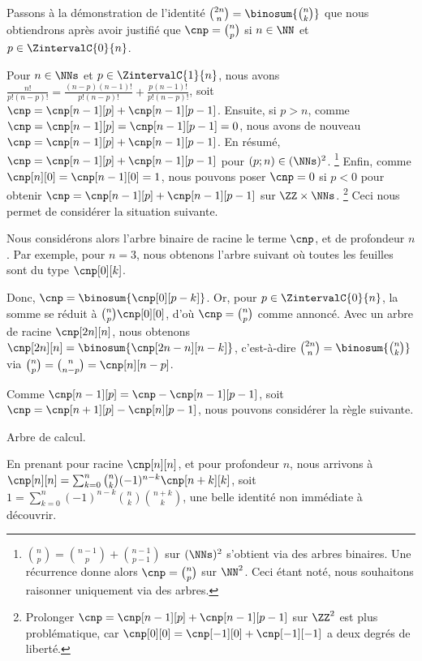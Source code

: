 Passons à la démonstration de
l'identité $\binom{2n}{n} = \binosum{\binom{n}{k}}$
que nous obtiendrons après avoir justifié que
$\cnp = \binom{n}{p}$ si $n \in \NN$ et $p \in \ZintervalC{0}{n}$.


Pour $n \in \NNs$ et $p \in \ZintervalC{1}{n}$,
nous avons
$\frac{n!}{p!(n-p)!}
=\frac{(n-p)(n-1)!}{p!(n-p)!} + \frac{p(n-1)!}{p!(n-p)!}$,
soit
$\cnp = \cnp[n-1][p] + \cnp[n-1][p-1]$.
Ensuite,
si $p > n$, comme
$\cnp = \cnp[n-1][p] = \cnp[n-1][p-1] = 0$,
nous avons de nouveau
$\cnp = \cnp[n-1][p] + \cnp[n-1][p-1]$.
En résumé,
$\cnp = \cnp[n-1][p] + \cnp[n-1][p-1]$ pour $(p;n) \in (\NNs)^2$.%
\footnote{
    $\binom{n}{p} = \binom{n-1}{p} + \binom{n-1}{p-1}$ sur $ (\NNs)^2$
    s'obtient via des arbres binaires.
    Une récurrence donne alors
    $\cnp = \binom{n}{p}$ sur $\NN^2$.
    Ceci étant noté, nous souhaitons raisonner uniquement via des arbres.
}
Enfin,
comme
$\cnp[n][0] = \cnp[n-1][0] = 1$,
nous pouvons poser
$\cnp = 0$ si $p < 0$
pour obtenir
$\cnp = \cnp[n-1][p] + \cnp[n-1][p-1]$ sur $\ZZ \times \NNs$.%
\footnote{
    Prolonger $\cnp = \cnp[n-1][p] + \cnp[n-1][p-1]$ sur $\ZZ^2$ est plus problématique, car $\cnp[0][0] = \cnp[-1][0] + \cnp[-1][-1]$ a deux degrés de liberté.
}
%
Ceci nous permet de considérer la situation suivante.

\explaintree{\cnp}{\cnp[n-1][p-1]}{\cnp[n-1][p]}%
            {\factobinomintertree}{}


Nous considérons alors l'arbre binaire de racine le terme $\cnp$, et de profondeur $n$.
Par exemple, pour $n=3$, nous obtenons l'arbre suivant où toutes les feuilles sont du type $\cnp[0][k]$.


Donc,
$\cnp = \binosum{\cnp[0][p-k]}$.
Or, pour $p \in \ZintervalC{0}{n}$, la somme se réduit à $\binom{n}{p} \cnp[0][0]$, d'où $\cnp = \binom{n}{p}$ comme annoncé.
%
Avec un arbre de racine $\cnp[2n][n]$, nous obtenons
$\cnp[2n][n] = \binosum{\cnp[2n - n][n-k]}$,
c'est-à-dire
$\binom{2n}{n} = \binosum{\binom{n}{k}}$
via
$\binom{n}{p} = \binom{n}{n - p} = \cnp[n][n-p]$.




\begin{remark}
    Comme $\cnp[n-1][p] = \cnp - \cnp[n-1][p-1]$,
    soit $\cnp = \cnp[n+1][p] - \cnp[n][p-1]$,
    nous pouvons considérer la règle suivante.

    \begin{center}
        \itshape\centering

        \calctree{\cnp}{\cnp[n+1][p]}{-\cnp[n][p-1]}

        Arbre de calcul.
    \end{center}

    En prenant pour racine $\cnp[n][n]$, et pour profondeur $n$,
    nous arrivons à
    $\cnp[n][n] = \sum_{k=0}^n \binom{n}{k} (-1)^{n-k} \cnp[n+k][k]$,
    soit
    $1 = \sum_{k=0}^n (-1)^{n-k} \binom{n}{k} \binom{n+k}{k}$,
    une belle identité non immédiate à découvrir.
\end{remark}
